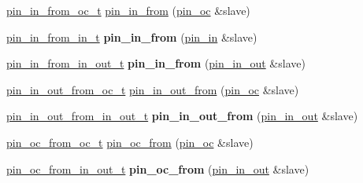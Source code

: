 \textbf{ }\par
\begin{DoxyCompactItemize}
\item 
\hyperlink{classhwlib_1_1pin__in__from__oc__t}{pin\+\_\+in\+\_\+from\+\_\+oc\+\_\+t} \hyperlink{namespacehwlib_a2f8ff4c157c60783c37db6bb1e11e3a4}{pin\+\_\+in\+\_\+from} (\hyperlink{classhwlib_1_1pin__oc}{pin\+\_\+oc} \&slave)
\item 
\mbox{\label{namespacehwlib_a1efeb96ba608232c2452645704c83160}} 
\hyperlink{classhwlib_1_1pin__in__from__in__t}{pin\+\_\+in\+\_\+from\+\_\+in\+\_\+t} {\bfseries pin\+\_\+in\+\_\+from} (\hyperlink{classhwlib_1_1pin__in}{pin\+\_\+in} \&slave)
\item 
\mbox{\label{namespacehwlib_afff5475ce3317d8ad97933a611f33ea3}} 
\hyperlink{classhwlib_1_1pin__in__from__in__out__t}{pin\+\_\+in\+\_\+from\+\_\+in\+\_\+out\+\_\+t} {\bfseries pin\+\_\+in\+\_\+from} (\hyperlink{classhwlib_1_1pin__in__out}{pin\+\_\+in\+\_\+out} \&slave)
\end{DoxyCompactItemize}

\textbf{ }\par
\begin{DoxyCompactItemize}
\item 
\hyperlink{classhwlib_1_1pin__in__out__from__oc__t}{pin\+\_\+in\+\_\+out\+\_\+from\+\_\+oc\+\_\+t} \hyperlink{namespacehwlib_ab2c0c1d086f745d266ad2d247187f65f}{pin\+\_\+in\+\_\+out\+\_\+from} (\hyperlink{classhwlib_1_1pin__oc}{pin\+\_\+oc} \&slave)
\item 
\mbox{\label{namespacehwlib_ac4fd92daeafd41d14e6c907195014a21}} 
\hyperlink{classhwlib_1_1pin__in__out__from__in__out__t}{pin\+\_\+in\+\_\+out\+\_\+from\+\_\+in\+\_\+out\+\_\+t} {\bfseries pin\+\_\+in\+\_\+out\+\_\+from} (\hyperlink{classhwlib_1_1pin__in__out}{pin\+\_\+in\+\_\+out} \&slave)
\end{DoxyCompactItemize}

\textbf{ }\par
\begin{DoxyCompactItemize}
\item 
\hyperlink{classhwlib_1_1pin__oc__from__oc__t}{pin\+\_\+oc\+\_\+from\+\_\+oc\+\_\+t} \hyperlink{namespacehwlib_aa2c63efcb24f3d5124567356d8c8a804}{pin\+\_\+oc\+\_\+from} (\hyperlink{classhwlib_1_1pin__oc}{pin\+\_\+oc} \&slave)
\item 
\mbox{\label{namespacehwlib_aadf46e836cefb756596267ec58d268f7}} 
\hyperlink{classhwlib_1_1pin__oc__from__in__out__t}{pin\+\_\+oc\+\_\+from\+\_\+in\+\_\+out\+\_\+t} {\bfseries pin\+\_\+oc\+\_\+from} (\hyperlink{classhwlib_1_1pin__in__out}{pin\+\_\+in\+\_\+out} \&slave)
\end{DoxyCompactItemize}

